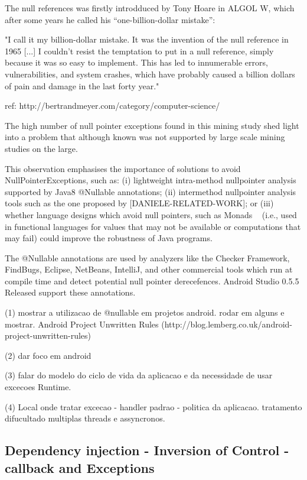 \documentclass[conference]{IEEEtran}
\begin{document}
The null references was firstly introdduced by Tony Hoare in ALGOL W, which after some years he called his “one-billion-dollar mistake”:

"I call it my billion-dollar mistake. It was the invention of the null reference in 1965 [...] I couldn’t resist the temptation to put 
in a null reference, simply because it was so easy to implement. This has led to innumerable errors, vulnerabilities, and system 
crashes, which have probably caused a billion dollars of pain and damage in the last forty year."

ref: http://bertrandmeyer.com/category/computer-science/

The high number of null pointer exceptions found in this mining study shed light into a problem
that although known was not supported by large scale mining studies on the large.  

This observation emphasises the importance of solutions to avoid NullPointerExceptions, such as:
(i) lightweight intra-method nullpointer analysis supported by Java8 @Nullable annotations;
(ii) intermethod nullpointer analysis tools such as the one proposed by [DANIELE-RELATED-WORK];
or (iii) whether language designs which avoid null pointers, such 
as Monads ~\cite{Walde95} (i.e., used in functional languages for values that may not be available 
or computations that may fail) could improve the robustness of Java programs. 

The @Nullable annotations are used by analyzers like the Checker Framework, FindBugs, Eclipse, 
NetBeans, IntelliJ, and other commercial tools which run at compile time and detect potential null 
pointer derecefences. Android Studio 0.5.5 Released support these annotations.


(1) mostrar a utilizacao de @nullable em projetos android. rodar em alguns e mostrar.
Android Project Unwritten Rules (http://blog.lemberg.co.uk/android-project-unwritten-rules)

(2) dar foco em android

(3) falar do modelo do ciclo de vida da aplicacao e da necessidade de usar excecoes Runtime.

(4) Local onde tratar excecao - handler padrao - politica da aplicacao. tratamento difucultado multiplas threads e assyncronos.




\subsection{Dependency injection - Inversion of Control -  callback and Exceptions}  
\end{document}
